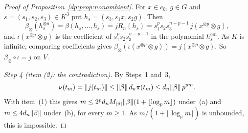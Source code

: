 \begin{proof}[Proof of Proposition~\ref{dp:prop:nonambient}]
For $x\in c_0$, $g\in G$ and $s=(s_1,s_2,s_3)\in K^3$ put $h_s=(s_3,s_1x,s_2g)$. Then
\[
 \beta_\otimes(h_s^{\otimes n})=\beta(h_s,\dots,h_s)=jR_n(h_s)=s_1^ps_2s_3^{n-p-1}\,j(x^{\otimes p}\otimes g),
\]
and $\iota(x^{\otimes p}\otimes g)$ is the coefficient of $s_1^ps_2s_3^{n-p-1}$ in the polynomial $h_s^{\otimes n}$. As $K$ is infinite, comparing coefficients gives $\beta_\otimes(\iota(x^{\otimes p}\otimes g))=j(x^{\otimes p}\otimes g)$. So $\beta_\otimes\circ\iota=j$ on $V$.

\emph{Step 4 (item (2): the contradiction).} By Steps~1 and~3,
\[
 \nu(t_m)=\lVert j(t_m)\rVert\le\lVert \beta\rVert\,d_n\pi(t_m)\le d_n\lVert \beta\rVert\,p^{pm}.
\]
With item~(1) this gives $m\le2^pd_nM_{\lvert \vartheta\rvert}\lVert \beta\rVert(1+\lfloor\log_pm\rfloor)$ under~(a) and $m\le4d_n\lVert \beta\rVert$ under~(b), for every $m\ge1$. As $m/(1+\lfloor\log_pm\rfloor)$ is unbounded, this is impossible.
\end{proof}

